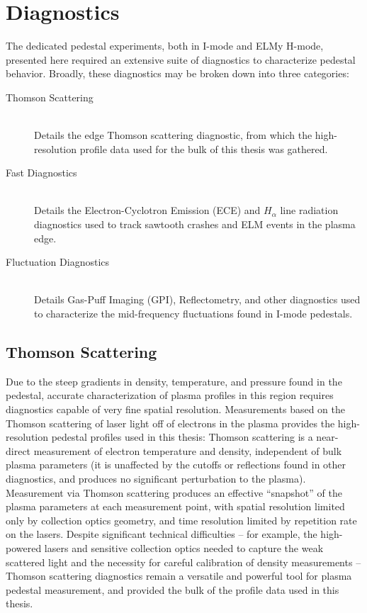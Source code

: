 \chapter{Diagnostics}\label{app:Diagnostics}

The dedicated pedestal experiments, both in I-mode and ELMy H-mode, presented here required an extensive suite of diagnostics to characterize pedestal behavior.  Broadly, these diagnostics may be broken down into three categories:

\begin{description}
 \item[Thomson Scattering] \hfill \\
 Details the edge Thomson scattering diagnostic, from which the high-resolution profile data used for the bulk of this thesis was gathered.
 \item[Fast Diagnostics] \hfill \\
 Details the Electron-Cyclotron Emission (ECE) and $H_\alpha$ line radiation diagnostics used to track sawtooth crashes and ELM events in the plasma edge.
 \item[Fluctuation Diagnostics] \hfill \\
 Details Gas-Puff Imaging (GPI), Reflectometry, and other diagnostics used to characterize the mid-frequency fluctuations found in I-mode pedestals.\nicesectionending
\end{description}

\section{Thomson Scattering}\label{sec:app_ts}

Due to the steep gradients in density, temperature, and pressure found in the pedestal, accurate characterization of plasma profiles in this region requires diagnostics capable of very fine spatial resolution.  Measurements based on the Thomson scattering \cite{Sheffield} of laser light off of electrons in the plasma provides the high-resolution pedestal profiles used in this thesis: Thomson scattering is a near-direct measurement of electron temperature and density, independent of bulk plasma parameters (\ie it is unaffected by the cutoffs or reflections found in other diagnostics, and produces no significant perturbation to the plasma).  Measurement via Thomson scattering produces an effective ``snapshot'' of the plasma parameters at each measurement point, with spatial resolution limited only by collection optics geometry, and time resolution limited by repetition rate on the lasers.  Despite significant technical difficulties -- for example, the high-powered lasers and sensitive collection optics needed 
to capture the weak scattered light and the necessity for careful calibration of density measurements -- Thomson scattering diagnostics remain a versatile and powerful tool for plasma pedestal measurement, and provided the bulk of the profile data used in this thesis.

